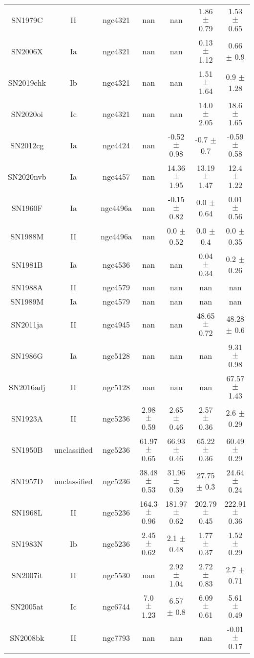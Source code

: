 \begin{table}
\begin{tabular}{ccccccc}
SN1979C & II & ngc4321 & nan & nan & 1.86 $\pm$ 0.79 & 1.53 $\pm$ 0.65 \\
SN2006X & Ia & ngc4321 & nan & nan & 0.13 $\pm$ 1.12 & 0.66 $\pm$ 0.9 \\
SN2019ehk & Ib & ngc4321 & nan & nan & 1.51 $\pm$ 1.64 & 0.9 $\pm$ 1.28 \\
SN2020oi & Ic & ngc4321 & nan & nan & 14.0 $\pm$ 2.05 & 18.6 $\pm$ 1.65 \\
SN2012cg & Ia & ngc4424 & nan & -0.52 $\pm$ 0.98 & -0.7 $\pm$ 0.7 & -0.59 $\pm$ 0.58 \\
SN2020nvb & Ia & ngc4457 & nan & 14.36 $\pm$ 1.95 & 13.19 $\pm$ 1.47 & 12.4 $\pm$ 1.22 \\
SN1960F & Ia & ngc4496a & nan & -0.15 $\pm$ 0.82 & 0.0 $\pm$ 0.64 & 0.01 $\pm$ 0.56 \\
SN1988M & II & ngc4496a & nan & 0.0 $\pm$ 0.52 & 0.0 $\pm$ 0.4 & 0.0 $\pm$ 0.35 \\
SN1981B & Ia & ngc4536 & nan & nan & 0.04 $\pm$ 0.34 & 0.2 $\pm$ 0.26 \\
SN1988A & II & ngc4579 & nan & nan & nan & nan \\
SN1989M & Ia & ngc4579 & nan & nan & nan & nan \\
SN2011ja & II & ngc4945 & nan & nan & 48.65 $\pm$ 0.72 & 48.28 $\pm$ 0.6 \\
SN1986G & Ia & ngc5128 & nan & nan & nan & 9.31 $\pm$ 0.98 \\
SN2016adj & II & ngc5128 & nan & nan & nan & 67.57 $\pm$ 1.43 \\
SN1923A & II & ngc5236 & 2.98 $\pm$ 0.59 & 2.65 $\pm$ 0.46 & 2.57 $\pm$ 0.36 & 2.6 $\pm$ 0.29 \\
SN1950B & unclassified & ngc5236 & 61.97 $\pm$ 0.65 & 66.93 $\pm$ 0.46 & 65.22 $\pm$ 0.36 & 60.49 $\pm$ 0.29 \\
SN1957D & unclassified & ngc5236 & 38.48 $\pm$ 0.53 & 31.96 $\pm$ 0.39 & 27.75 $\pm$ 0.3 & 24.64 $\pm$ 0.24 \\
SN1968L & II & ngc5236 & 164.3 $\pm$ 0.96 & 181.97 $\pm$ 0.62 & 202.79 $\pm$ 0.45 & 222.91 $\pm$ 0.36 \\
SN1983N & Ib & ngc5236 & 2.45 $\pm$ 0.62 & 2.1 $\pm$ 0.48 & 1.77 $\pm$ 0.37 & 1.52 $\pm$ 0.29 \\
SN2007it & II & ngc5530 & nan & 2.92 $\pm$ 1.04 & 2.72 $\pm$ 0.83 & 2.7 $\pm$ 0.71 \\
SN2005at & Ic & ngc6744 & 7.0 $\pm$ 1.23 & 6.57 $\pm$ 0.8 & 6.09 $\pm$ 0.61 & 5.61 $\pm$ 0.49 \\
SN2008bk & II & ngc7793 & nan & nan & nan & -0.01 $\pm$ 0.17 \\
\end{tabular}
\end{table}
